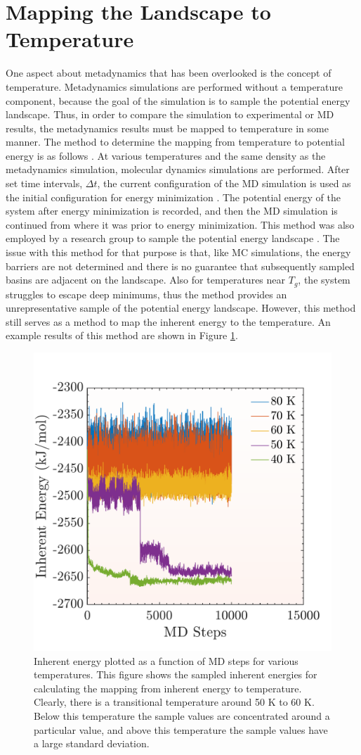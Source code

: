\section{Mapping the Landscape to Temperature}
One aspect about metadynamics that has been overlooked is the concept of temperature.  Metadynamics simulations are performed without a temperature component, because the goal of the simulation is to sample the potential energy landscape.  Thus, in order to compare the simulation to experimental or MD results, the metadynamics results must be mapped to temperature in some manner.  The method to determine the mapping from temperature to potential energy is as follows \cite{Kushima2009, Kushima2009a}.  At various temperatures and the same density as the metadynamics simulation, molecular dynamics simulations are performed.  After set time intervals, $\Delta t$, the current configuration of the MD simulation is used as the initial configuration for energy minimization \cite{Kushima2009, Kushima2009a}.  The potential energy of the system after energy minimization is recorded, and then the MD simulation is continued from where it was prior to energy minimization.  This method was also employed by a research group to sample the potential energy landscape \cite{quench}.  The issue with this method for that purpose is that, like MC simulations, the energy barriers are not determined and there is no guarantee that subsequently sampled basins are adjacent on the landscape.  Also for temperatures near $T_g$, the system struggles to escape deep minimums, thus the method provides an unrepresentative sample of the potential energy landscape.  However, this method still serves as a method to map the inherent energy to the temperature. An example results of this method are shown in Figure \ref{temperature_cuts}. 

\begin{figure}[h]
	\centering
	\includegraphics[width = .5\textwidth]{./Figures/MTD/temperature_cuts.pdf}
	\caption{Inherent energy plotted as a function of MD steps for various temperatures.  This figure shows the sampled inherent energies for calculating the mapping from inherent energy to temperature.  Clearly, there is a transitional temperature around 50 K to 60 K.  Below this temperature the sample values are concentrated around a particular value, and above this temperature the sample values have a large standard deviation.}
	\label{temperature_cuts}
\end{figure}

